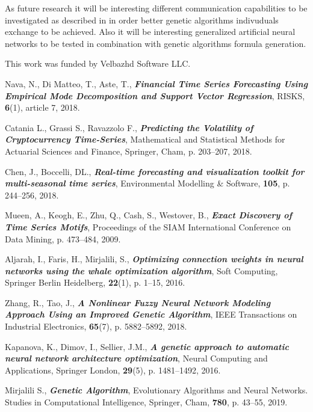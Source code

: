 \documentclass[graybox]{svmult}
\begin{document}
As future research it will be interesting different communication capabilities to be investigated as described in \cite{alexandrov01} in order better genetic algorithms indivuduals exchange to be achieved. Also it will be interesting generalized artificial neural networks \cite{tashev01} to be tested in combination with genetic algorithms formula generation.

\begin{acknowledgement}
This work was funded by Velbazhd Software LLC.
\end{acknowledgement}

\begin{thebibliography}{99}

 Nava, N., Di Matteo, T., Aste, T., \textbf{\textit{Financial Time Series Forecasting Using Empirical Mode Decomposition and Support Vector Regression}}, RISKS, \textbf{6}(1), article 7, 2018.

 Catania L., Grassi S., Ravazzolo F., \textbf{\textit{Predicting the Volatility of Cryptocurrency Time-Series}}, Mathematical and Statistical Methods for Actuarial Sciences and Finance, Springer, Cham, p. 203--207, 2018.

 Chen, J., Boccelli, DL., \textbf{\textit{Real-time forecasting and visualization toolkit for multi-seasonal time series}}, Environmental Modelling \& Software, \textbf{105}, p. 244--256, 2018.

 Mueen, A., Keogh, E., Zhu, Q., Cash, S., Westover, B., \textbf{\textit{Exact Discovery of Time Series Motifs}}, Proceedings of the SIAM International Conference on Data Mining, p. 473--484, 2009.

 Aljarah, I., Faris, H., Mirjalili, S., \textbf{\textit{Optimizing connection weights in neural networks using the whale optimization algorithm}}, Soft Computing, Springer Berlin Heidelberg, \textbf{22}(1), p. 1--15, 2016.

 Zhang, R., Tao, J., \textbf{\textit{A Nonlinear Fuzzy Neural Network Modeling Approach Using an Improved Genetic Algorithm}}, IEEE Transactions on Industrial Electronics, \textbf{65}(7), p. 5882--5892, 2018.

 Kapanova, K., Dimov, I., Sellier, J.M., \textbf{\textit{A genetic approach to automatic neural network architecture optimization}}, Neural Computing and Applications, Springer London, \textbf{29}(5), p. 1481--1492, 2016.

 Mirjalili S., \textbf{\textit{Genetic Algorithm}}, Evolutionary Algorithms and Neural Networks. Studies in Computational Intelligence, Springer, Cham, \textbf{780}, p. 43--55, 2019.


\end{thebibliography}
\end{document}
